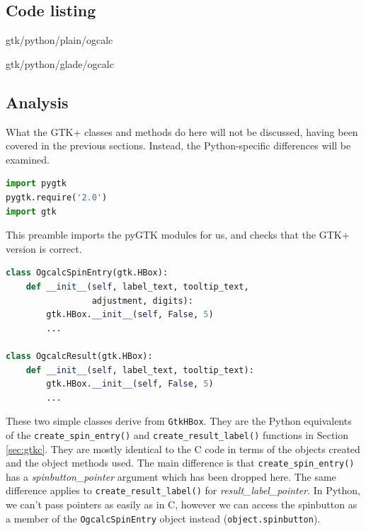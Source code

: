 \documentclass[a4paper,oneside]{article}
\newcommand{\filename}[1]{\texttt{#1}}
\newcommand{\variable}[1]{\textsl{#1}}
\newcommand{\class}[1]{\texttt{#1}}
\newcommand{\function}[1]{\texttt{#1()}}
\newcommand{\code}[1]{\texttt{#1}}
\begin{document}
\subsection{Code listing}


                 {gtk/python/plain/ogcalc}


                 {gtk/python/glade/ogcalc}

\subsection{Analysis}

What the GTK+ classes and methods do here will not be discussed,
having been covered in the previous sections.  Instead, the
Python-specific differences will be examined.

\begin{lstlisting}[numbers=none, language=Python]
import pygtk
pygtk.require('2.0')
import gtk
\end{lstlisting}

This preamble imports the pyGTK modules for us, and checks that the
GTK+ version is correct.

\begin{lstlisting}[numbers=none, language=Python]
class OgcalcSpinEntry(gtk.HBox):
    def __init__(self, label_text, tooltip_text,
                 adjustment, digits):
        gtk.HBox.__init__(self, False, 5)
        ...

class OgcalcResult(gtk.HBox):
    def __init__(self, label_text, tooltip_text):
        gtk.HBox.__init__(self, False, 5)
        ...
\end{lstlisting}

These two simple classes derive from \class{GtkHBox}.  They are the
Python equivalents of the \function{create\_spin\_entry} and
\function{create\_result\_label} functions in Section \ref{sec:gtkc}.
They are mostly identical to the C code in terms of the objects
created and the object methods used.  The main difference is that
\function{create\_spin\_entry} has a \variable{spinbutton\_pointer}
argument which has been dropped here.  The same difference applies to
\function{create\_result\_label} for
\variable{result\_label\_pointer}.  In Python, we can't pass pointers
as easily as in C, however we can access the spinbutton as a member of
the \class{OgcalcSpinEntry} object instead (\code{object.spinbutton}).
\end{document}
